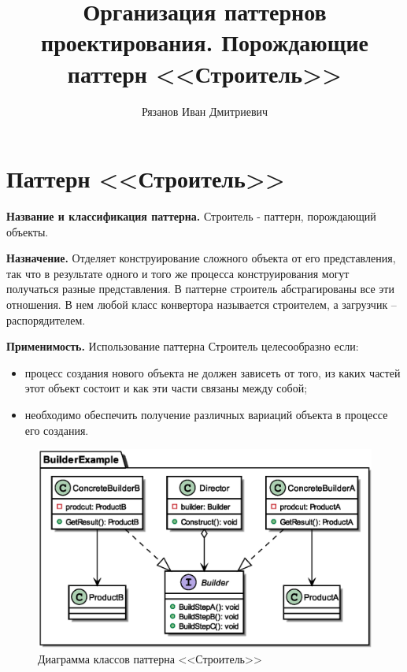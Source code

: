 \documentclass[PI,LAB]{HSEUniversity}
\title{Организация паттернов проектирования. Порождающие паттерн <<Строитель>>}
\author{Рязанов Иван Дмитриевич}
\begin{document}
\maketitle
\chapter{Паттерн <<Строитель>>}
\textbf{Название и классификация паттерна.}
Строитель - паттерн, порождающий объекты.

\textbf{Назначение.}
Отделяет конструирование сложного объекта от его представления, так что в результате одного и того же процесса конструирования могут получаться разные представления.
В паттерне строитель абстрагированы все эти отношения. В нем любой класс конвертора называется строителем, а загрузчик – распорядителем.

\textbf{Применимость.}
Использование паттерна Строитель целесообразно если:
\begin{itemize}
  \item процесс создания нового объекта не должен зависеть от того, из каких частей этот объект состоит и как эти части связаны между собой;
  \item необходимо обеспечить получение различных вариаций объекта в процессе его создания.
\end{itemize}
\clearpage

\begin{figure}[p]
  \centering
  \includegraphics[scale=0.7]{Builder_CD.eps}
  \caption{Диаграмма классов паттерна <<Строитель>>}
\end{figure}
\end{document}
